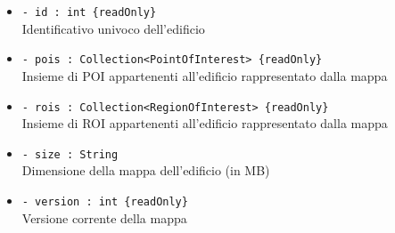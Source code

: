 \documentclass[../DefinizioneDiProdotto.tex]{subfiles}
\begin{document}
\begin{description}
\begin{itemize}
\item \texttt{- id : int \{readOnly\}}\\
Identificativo univoco dell'edificio

\item \texttt{- pois : Collection<PointOfInterest> \{readOnly\}}\\
Insieme di POI appartenenti all'edificio rappresentato dalla mappa

\item \texttt{- rois : Collection<RegionOfInterest> \{readOnly\}}\\
Insieme di ROI appartenenti all'edificio rappresentato dalla mappa

\item \texttt{- size : String}\\
Dimensione della mappa dell'edificio (in MB)

\item \texttt{- version : int \{readOnly\}}\\
Versione corrente della mappa


\end{itemize}
\end{description}
\end{document}
